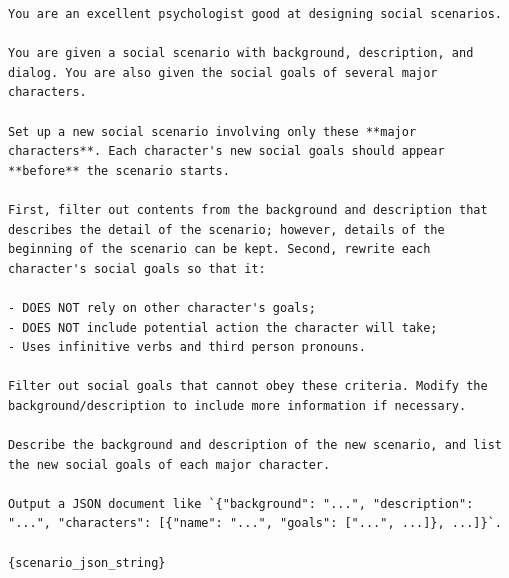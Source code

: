 \begin{tcolorbox}[width=\linewidth]
\begin{lstlisting}[caption=Scenario Rewriting]
You are an excellent psychologist good at designing social scenarios.

You are given a social scenario with background, description, and dialog. You are also given the social goals of several major characters.

Set up a new social scenario involving only these **major characters**. Each character's new social goals should appear **before** the scenario starts.

First, filter out contents from the background and description that describes the detail of the scenario; however, details of the beginning of the scenario can be kept. Second, rewrite each character's social goals so that it:

- DOES NOT rely on other character's goals;
- DOES NOT include potential action the character will take;
- Uses infinitive verbs and third person pronouns.

Filter out social goals that cannot obey these criteria. Modify the background/description to include more information if necessary.

Describe the background and description of the new scenario, and list the new social goals of each major character.

Output a JSON document like `{"background": "...", "description": "...", "characters": [{"name": "...", "goals": ["...", ...]}, ...]}`.

{scenario_json_string}
\end{lstlisting}
\end{tcolorbox}

